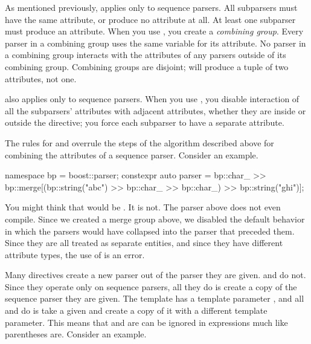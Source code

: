 \documentclass{MyBook}
\begin{document}
As mentioned previously,  applies only to sequence parsers. All subparsers must have the same attribute, or produce no attribute at all. At least one subparser must produce an attribute. When you use , you create a \emph{combining group}. Every parser in a combining group uses the same variable for its attribute. No parser in a combining group interacts with the attributes of any parsers outside of its combining group. Combining groups are disjoint;  will produce a tuple of two attributes, not one.

 also applies only to sequence parsers. When you use , you disable interaction of all the subparsers'{} attributes with adjacent attributes, whether they are inside or outside the  directive; you force each subparser to have a separate attribute.

The rules for  and  overrule the steps of the algorithm described above for combining the attributes of a sequence parser. Consider an example.

\begin{code}
namespace bp = boost::parser;
constexpr auto parser =
    bp::char_ >> bp::merge[(bp::string("abc") >> bp::char_ >> bp::char_) >> bp::string("ghi")];
\end{code}

You might think that \emph{} would be . It is not. The parser above does not even compile. Since we created a merge group above, we disabled the default behavior in which the  parsers would have collapsed into the  parser that preceded them. Since they are all treated as separate entities, and since they have different attribute types, the use of  is an error.

Many directives create a new parser out of the parser they are given.  and  do not. Since they operate only on sequence parsers, all they do is create a copy of the sequence parser they are given. The  template has a template parameter , and all  and  do is take a given  and create a copy of it with a different  template parameter. This means that  and  are can be ignored in  expressions much like parentheses are. Consider an example.
\end{document}

